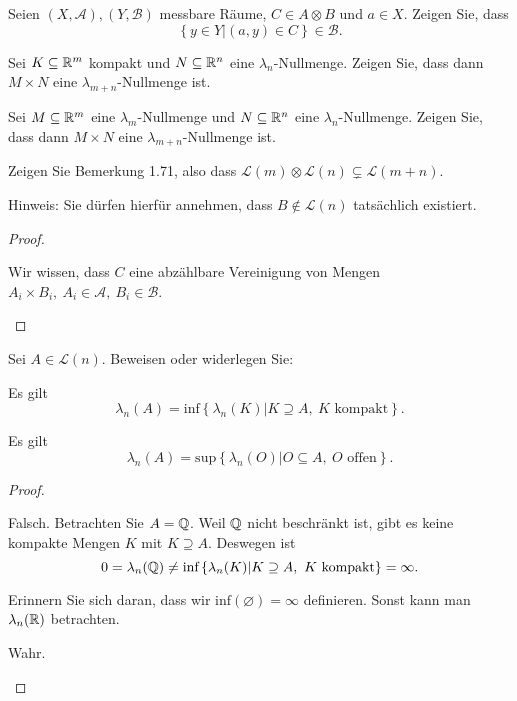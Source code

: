 \begin{Problem}
	\begin{parts}
		\item Seien $(X,\mathcal{A}), (Y,\mathcal{B})$ messbare R\"{a}ume, $C\in A\otimes B$ und $a\in X$. Zeigen Sie, dass
			\[
			\left\{ y\in Y|(a,y)\in C \right\} \in \mathcal{B}
			.\] 
		\item Sei $K\subseteq \mathbb{R}^m$ kompakt und $N\subseteq \mathbb{R}^n$ eine $\lambda_n$-Nullmenge. Zeigen Sie, dass dann $M \times N$ eine $\lambda_{m+n}$-Nullmenge ist.
		\item Sei $M\subseteq \mathbb{R}^m$ eine $\lambda_m$-Nullmenge und $N\subseteq \mathbb{R}^n$ eine $\lambda_n$-Nullmenge. Zeigen Sie, dass dann $M \times N$ eine $\lambda_{m+n}$-Nullmenge ist.
		\item Zeigen Sie Bemerkung 1.71, also dass $\mathcal{L}(m)\otimes \mathcal{L}(n)\subsetneq \mathcal{L}(m+n)$.

			{\footnotesize Hinweis: Sie dürfen hierfür annehmen, dass $B\not\in \mathcal{L}(n)$ tatsächlich existiert.}
	\end{parts}
\end{Problem}
\begin{proof}
	\begin{parts}
	\item Wir wissen, dass $C$ eine abzählbare Vereinigung von Mengen $A_i\times B_i,~A_i\in \mathcal{A},~B_i\in \mathcal{B}$.
	\end{parts}
\end{proof}
\begin{Problem}
	Sei $A\in \mathcal{L}(n)$. Beweisen oder widerlegen Sie:
	\begin{parts}
	\item Es gilt
		\[
			\lambda_n(A)=\text{inf}\left\{ \lambda_n(K)|K\supseteq A,~K\text{ kompakt} \right\} 
		.\] 
	\item Es gilt
		\[
			\lambda_n(A)=\text{sup}\left\{ \lambda_n(O)|O\subseteq A,~O\text{ offen} \right\} 
		.\] 
	\end{parts}
\end{Problem}
\begin{proof}
	\begin{parts}
	\item Falsch. Betrachten Sie $A=\mathbb{Q}$. Weil $\mathbb{Q}$ nicht beschränkt ist, gibt es keine kompakte Mengen $K$ mit $K\supseteq A$. Deswegen ist 
		\[0=\lambda_n(\mathbb{Q})\neq\text{inf}\left\{ \lambda_n(K)|K\supseteq A,~K\text{ kompakt} \right\}=\infty.\] 
		\begin{tcolorbox}[title=Bemerkung]
			Erinnern Sie sich daran, dass wir $\text{inf}(\varnothing)=\infty$ definieren. Sonst kann man $\lambda_n(\mathbb{R})$ betrachten.
		\end{tcolorbox}
	\item Wahr. 
	\end{parts}
\end{proof}
